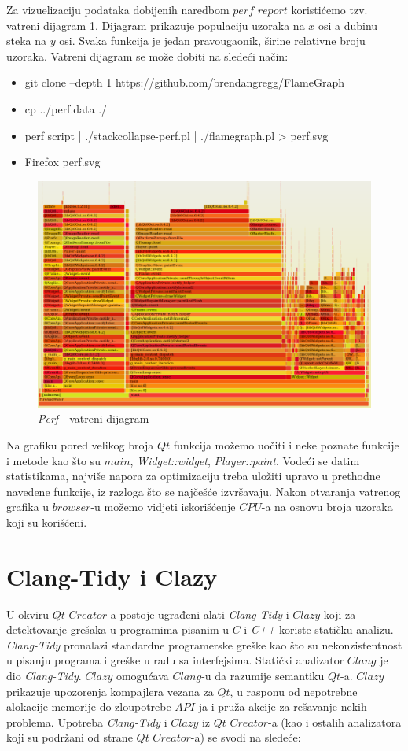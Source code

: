 \documentclass[a4paper]{article}
\begin{document}
Za vizuelizaciju podataka dobijenih naredbom $perf$ $report$ koristićemo tzv. vatreni dijagram \ref{fig:p2}. Dijagram prikazuje populaciju uzoraka na $x$ osi a dubinu steka na $y$ osi. Svaka funkcija je jedan pravougaonik, širine relativne broju uzoraka. Vatreni dijagram se može dobiti na sledeći način:
\begin{itemize}
	\item git clone --depth 1 https://github.com/brendangregg/FlameGraph
	\item cp ../perf.data ./
	\item perf script | ./stackcollapse-perf.pl | ./flamegraph.pl > perf.svg
	\item Firefox perf.svg
\end{itemize}
	
	\begin{figure}[h!]
		\caption{\textit{Perf} - vatreni dijagram}
		\label{fig:p2}
		\includegraphics[scale=0.4]{p2.png}
	\end{figure}

Na grafiku pored velikog broja $Qt$ funkcija možemo uočiti i neke poznate funkcije i metode kao što su $main$, \textit{Widget::widget}, \textit{Player::paint}. Vodeći se datim statistikama, najviše napora za optimizaciju treba uložiti upravo u prethodne navedene funkcije, iz razloga što se najčešće izvršavaju. Nakon otvaranja vatrenog grafika u $browser$-u možemo vidjeti iskorišćenje $CPU$-a na osnovu broja uzoraka koji su korišćeni.

\section{Clang-Tidy i Clazy}
	U okviru $Qt$ $Creator$-a postoje ugrađeni alati \textit{Clang-Tidy} i $Clazy$ koji za detektovanje grešaka u programima pisanim u $C$ i \textit{C++} koriste statičku analizu.
\textit{Clang-Tidy} pronalazi standardne programerske greške kao što su nekonzistentnost  u pisanju programa i greške u radu sa interfejsima. Statički analizator $Clang$ je dio \textit{Clang-Tidy}.
$Clazy$ omogućava $Clang$-u da razumije semantiku $Qt$-a. $Clazy$ prikazuje upozorenja kompajlera vezana za $Qt$, u rasponu od nepotrebne alokacije memorije do zloupotrebe $API$-ja i pruža akcije za rešavanje nekih problema.
Upotreba \textit{Clang-Tidy} i $Clazy$ iz $Qt$ $Creator$-a (kao i ostalih analizatora koji su podržani od strane $Qt$ $Creator$-a) se svodi na sledeće:
\end{document}
